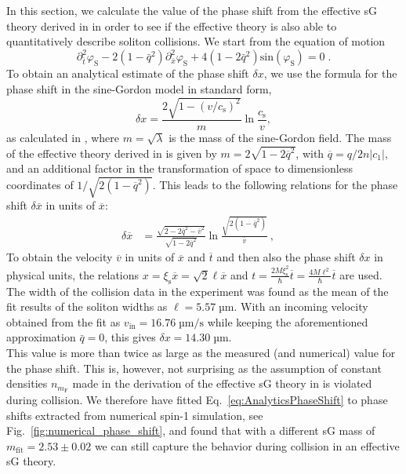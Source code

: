 \documentclass[aps,

               pra,
               twocolumn,
               amsmath,
               amssymb,
               superscriptaddress,
               reprint,
               10pt
              ]{revtex4-2}
\newcommand{\phis}{\varphi_\mathrm{S}}
\newcommand{\mf}{m_\mathrm{F}}
\begin{document}
\begin{appendix}
In this section, we calculate the value of the phase shift from the effective sG theory derived in \cite{Siovitz2025} in order to see if the effective theory is also able to quantitatively describe soliton collisions. We start from the equation of motion
\begin{equation}
    \partial_{\bar{t}}^2 \phis - 2(1-\bar{q}^2) \partial_{\bar{x}}^2 \phis + 4(1-2 \bar{q}^2) \mathrm{sin}(\phis) = 0 \; .
\end{equation}
To obtain an analytical estimate of the phase shift $\delta x$, we use the formula for the phase shift in the sine-Gordon model in standard form,
\begin{equation}\label{eq:AnalyticsPhaseShift}
    \delta x = \frac{2 \sqrt{1-(v/c_\mathrm{s})^2}}{m}\ln{\frac{c_\mathrm{s}}{v}},
\end{equation}
as calculated in \cite{Koch2023}, where $m=\sqrt{\lambda}$ is the mass of the sine-Gordon field.
The mass of the effective theory derived in \cite{Siovitz2025}  is given by
$m=2\sqrt{1-2\overline{q}^2}$, with $\overline{q}=q/2n|c_1|$, and an additional factor in the transformation of space to dimensionless coordinates of $1 / \sqrt{2(1-\overline{q}^2)}$.
This leads to the following relations for the phase shift $\delta\overline{x}$ in units of $\overline{x}$:
\begin{align}
    \delta\overline{x}&= \frac{\sqrt{2-2\overline{q}^2 - \overline{v}^2}}{\sqrt{1-2\overline{q}^2}}\ln{\frac{\sqrt{2(1-\overline{q}^2)}}{\overline{v}}}\:,\quad
\end{align}
To obtain the velocity $\overline{v}$ in units of $\overline{x}$ and $\overline{t}$ and then also the phase shift $\delta x$ in physical units, the relations $x=\xi_\mathrm{s}\overline{x}=\sqrt{2}\ell \overline{x}$ and $t=\frac{2M\xi_\mathrm{s}^2}{\hbar}\overline{t}=\frac{4M\ell^2}{\hbar}\overline{t}$ \cite{Siovitz2025} are used.
The width of the collision data in the experiment was found as the mean of the fit results of the soliton widths as $\ell=5.57 \;\text{µm}$.
With an incoming velocity obtained from the fit as $v_{\mathrm{in}}=16.76\; \text{µm}/\text{s}$ while keeping the aforementioned approximation $\bar{q}=0$, this gives $\delta x = 14.30 \;\text{µm}$. \\
This value is more than twice as large as the measured (and numerical) value for the phase shift. This is, however, not surprising as the assumption of constant densities $n_{\mf}$ made in the derivation of the effective sG theory in \cite{Siovitz2025} is violated during collision. We therefore have fitted Eq.~\eqref{eq:AnalyticsPhaseShift} to phase shifts extracted from numerical spin-1 simulation, see Fig.~\ref{fig:numerical_phase_shift},  and found that with a different sG mass of $m_{\mathrm{fit}} = 2.53\pm0.02$ we can still capture the behavior during collision in an effective sG theory.





\end{appendix}
\twocolumngrid



\end{document}
